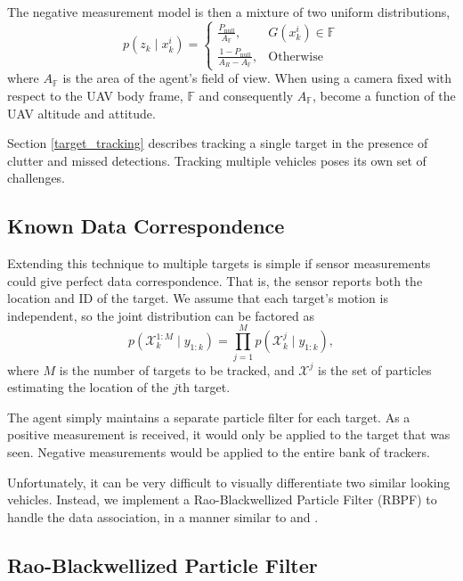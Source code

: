 \documentclass[letterpaper, 10 pt, conference]{ieeeconf}  %
\begin{document}
The negative measurement model is then a mixture of two uniform distributions,
\begin{equation}%
    p(z_k \mid x^i_k) =
    \begin{cases}
        \frac{P_{\text{null}}}{A_{\mathbb{F}}}, \quad & G(x^i_k) \in \mathbb{F} \\
        \frac{1 - P_{\text{null}}}{A_R - A_{\mathbb{F}}}, & \text{Otherwise}
    \end{cases}
\end{equation}
where $A_{\mathbb{F}}$ is the area of the agent's field of view. When using a camera fixed with respect to the UAV body frame, $\mathbb{F}$ and consequently $A_{\mathbb{F}}$, become a function of the UAV altitude and attitude.

Section \ref{target_tracking} describes tracking a single target in the presence of clutter and missed detections. Tracking multiple vehicles poses its own set of challenges.

\subsection{Known Data Correspondence}

Extending this technique to multiple targets is simple if sensor measurements could give perfect data correspondence. That is, the sensor reports both the location and ID of the target. We assume that each target's motion is independent, so the joint distribution can be factored as
\begin{equation}\label{eq:oracle_trackers}
    p(\mathcal{X}^{1:M}_{k} \mid y_{1:k}) = \prod_{j=1}^M p(\mathcal{X}^{j}_{k} \mid y_{1:k}),
\end{equation}
where $M$ is the number of targets to be tracked, and $\mathcal{X}^j$ is the set of particles estimating the location of the $j$th target.

The agent simply maintains a separate particle filter for each target. As a positive measurement is received, it would only be applied to the target that was seen. Negative measurements would be applied to the entire bank of trackers.

Unfortunately, it can be very difficult to visually differentiate two similar looking vehicles. Instead, we implement a Rao-Blackwellized Particle Filter (RBPF) to handle the data association, in a manner similar to \cite{Ahmed2017} and \cite{Sarkka2007}.

\subsection{Rao-Blackwellized Particle Filter}
\end{document}
